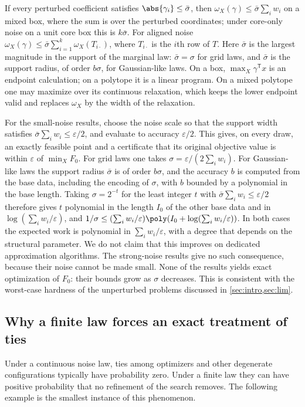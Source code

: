 If every perturbed coefficient satisfies $\abs{\gamma_i}\le\bar\sigma$, then
$\omega_X(\gamma)\le\bar\sigma\sum_iw_i$ on a mixed box, where the sum is
over the perturbed coordinates; under core-only noise on a unit core box this
is $k\bar\sigma$. For aligned noise $\omega_X(\gamma)\le\bar\sigma
\sum_{i=1}^k\omega_X(T_{i\cdot})$, where $T_{i\cdot}$ is the $i$th row of
$T$. Here $\bar\sigma$ is the largest magnitude in the support of the
marginal law: $\bar\sigma=\sigma$ for grid laws, and $\bar\sigma$ is the
support radius, of order $b\sigma$, for Gaussian-like laws. On a box,
$\max_X\gamma^{\mathsf T}x$ is an endpoint calculation; on a polytope it is a
linear program. On a mixed polytope one may maximize over its continuous
relaxation, which keeps the lower endpoint valid and replaces $\omega_X$ by
the width of the relaxation.

For the small-noise results, choose the noise scale so that the support
width satisfies $\bar\sigma\sum_iw_i\le\varepsilon/2$, and evaluate to
accuracy $\varepsilon/2$. This gives, on every draw, an exactly feasible
point and a certificate that its original objective value is within
$\varepsilon$ of $\min_XF_0$. For grid laws one takes
$\sigma=\varepsilon/(2\sum_iw_i)$. For Gaussian-like laws the support radius
$\bar\sigma$ is of order $b\sigma$, and the accuracy $b$ is computed from the
base data, including the encoding of $\sigma$, with $b$ bounded by a
polynomial in the base length. Taking $\sigma=2^{-t}$ for the least integer
$t$ with $\bar\sigma\sum_iw_i\le\varepsilon/2$ therefore gives $t$ polynomial
in the length $I_0$ of the other base data and in
$\log(\sum_iw_i/\varepsilon)$, and
$1/\sigma\le(\sum_iw_i/\varepsilon)\poly(I_0+\log(\sum_iw_i/\varepsilon))$. In
both cases the expected work is polynomial in $\sum_iw_i/\varepsilon$, with a
degree that depends on the structural parameter. We do not claim that this
improves on dedicated approximation algorithms. The strong-noise results give no such
consequence, because their noise cannot be made small. None of the results
yields exact optimization of $F_0$: their bounds grow as $\sigma$ decreases.
This is consistent with the worst-case hardness of the unperturbed problems
discussed in \cref{sec:intro,sec:lim}.

\subsection{Why a finite law forces an exact treatment of ties}\label{sec:model:atom}

Under a continuous noise law, ties among optimizers and other degenerate
configurations typically have probability zero. Under a finite law they can
have positive probability that no refinement of the search removes. The
following example is the smallest instance of this phenomenon.

